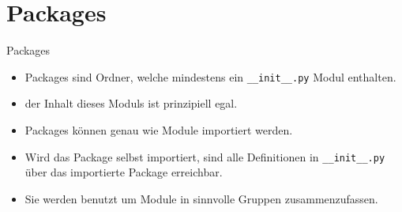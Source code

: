 \section{Packages}
\begin{frame}{Packages}
	\begin{itemize}
		\item Packages sind Ordner, welche mindestens ein \texttt{\_\_init\_\_.py} Modul enthalten.
		\item der Inhalt dieses Moduls ist prinzipiell egal.
		\item Packages können genau wie Module importiert werden.
		\item Wird das Package selbst importiert, sind alle Definitionen in \texttt{\_\_init\_\_.py} über das importierte Package erreichbar.
		\item Sie werden benutzt um Module in sinnvolle Gruppen zusammenzufassen.
	\end{itemize}
\end{frame}


